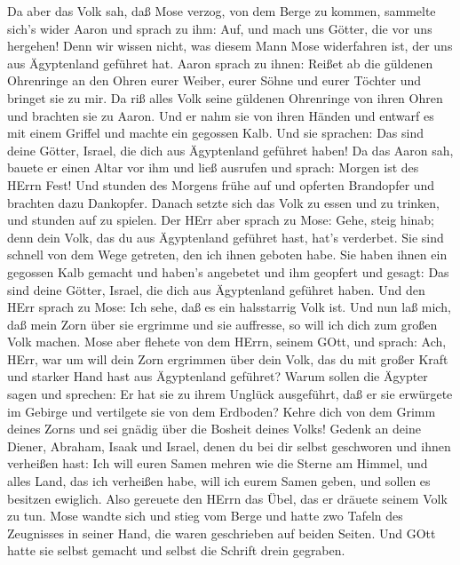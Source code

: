 Da aber das Volk sah, daß Mose verzog, von dem Berge zu
kommen, sammelte sich's wider Aaron und sprach zu ihm: Auf, und mach uns
Götter, die vor uns hergehen! Denn wir wissen nicht, was diesem Mann
Mose widerfahren ist, der uns aus Ägyptenland geführet hat. 
Aaron sprach zu ihnen: Reißet ab die güldenen Ohrenringe an den Ohren
eurer Weiber, eurer Söhne und eurer Töchter und bringet sie zu mir.
 Da riß alles Volk seine güldenen Ohrenringe von ihren Ohren
und brachten sie zu Aaron.  Und er nahm sie von ihren Händen
und entwarf es mit einem Griffel und machte ein gegossen Kalb. Und sie
sprachen: Das sind deine Götter, Israel, die dich aus Ägyptenland
geführet haben!  Da das Aaron sah, bauete er einen Altar vor
ihm und ließ ausrufen und sprach: Morgen ist des HErrn Fest!
 Und stunden des Morgens frühe auf und opferten Brandopfer
und brachten dazu Dankopfer. Danach setzte sich das Volk zu essen und zu
trinken, und stunden auf zu spielen.  Der HErr aber sprach
zu Mose: Gehe, steig hinab; denn dein Volk, das du aus Ägyptenland
geführet hast, hat's verderbet.  Sie sind schnell von dem
Wege getreten, den ich ihnen geboten habe. Sie haben ihnen ein gegossen
Kalb gemacht und haben's angebetet und ihm geopfert und gesagt: Das sind
deine Götter, Israel, die dich aus Ägyptenland geführet haben.
 Und den HErr sprach zu Mose: Ich sehe, daß es ein
halsstarrig Volk ist.  Und nun laß mich, daß mein Zorn über
sie ergrimme und sie auffresse, so will ich dich zum großen Volk machen.
 Mose aber flehete von dem HErrn, seinem GOtt, und sprach:
Ach, HErr, war um will dein Zorn ergrimmen über dein Volk, das du mit
großer Kraft und starker Hand hast aus Ägyptenland geführet?
 Warum sollen die Ägypter sagen und sprechen: Er hat sie zu
ihrem Unglück ausgeführt, daß er sie erwürgete im Gebirge und vertilgete
sie von dem Erdboden? Kehre dich von dem Grimm deines Zorns und sei
gnädig über die Bosheit deines Volks!  Gedenk an deine
Diener, Abraham, Isaak und Israel, denen du bei dir selbst geschworen
und ihnen verheißen hast: Ich will euren Samen mehren wie die Sterne am
Himmel, und alles Land, das ich verheißen habe, will ich eurem Samen
geben, und sollen es besitzen ewiglich.  Also gereuete den
HErrn das Übel, das er dräuete seinem Volk zu tun.  Mose
wandte sich und stieg vom Berge und hatte zwo Tafeln des Zeugnisses in
seiner Hand, die waren geschrieben auf beiden Seiten.  Und
GOtt hatte sie selbst gemacht und selbst die Schrift drein gegraben.
